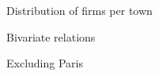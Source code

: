 \documentclass[12pt]{beamer}
\begin{document}
\begin{frame}{\textcolor{bscuro}{Distribution of firms per town}}
\begin{figure}[!ht] 
	\centering
\end{figure}
\end{frame}


\begin{frame}{\textcolor{bscuro}{Bivariate relations}}
\begin{figure}[!ht] 
	\centering
\end{figure}
Excluding Paris
\end{frame}
\end{document}
